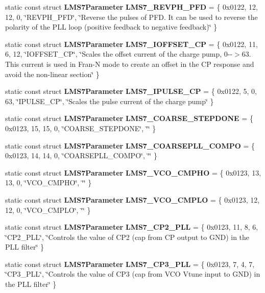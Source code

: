\begin{DoxyCompactItemize}
\item 
static const struct {\bf L\+M\+S7\+Parameter} {\bf L\+M\+S7\+\_\+\+R\+E\+V\+P\+H\+\_\+\+P\+FD} = \{ 0x0122, 12, 12, 0, \char`\"{}\+R\+E\+V\+P\+H\+\_\+\+P\+F\+D\char`\"{}, \char`\"{}\+Reverse the pulses of P\+F\+D. It can be used to reverse the polarity of the P\+L\+L loop (positive feedback to negative feedback)\char`\"{} \}
\item 
static const struct {\bf L\+M\+S7\+Parameter} {\bf L\+M\+S7\+\_\+\+I\+O\+F\+F\+S\+E\+T\+\_\+\+CP} = \{ 0x0122, 11, 6, 12, \char`\"{}\+I\+O\+F\+F\+S\+E\+T\+\_\+\+C\+P\char`\"{}, \char`\"{}\+Scales the offset current of the charge pump, 0-\/-\/$>$63. This current is used in Fran-\/\+N mode to create an offset in the C\+P response and avoid the non-\/linear section\char`\"{} \}
\item 
static const struct {\bf L\+M\+S7\+Parameter} {\bf L\+M\+S7\+\_\+\+I\+P\+U\+L\+S\+E\+\_\+\+CP} = \{ 0x0122, 5, 0, 63, \char`\"{}\+I\+P\+U\+L\+S\+E\+\_\+\+C\+P\char`\"{}, \char`\"{}\+Scales the pulse current of the charge pump\char`\"{} \}
\item 
static const struct {\bf L\+M\+S7\+Parameter} {\bf L\+M\+S7\+\_\+\+C\+O\+A\+R\+S\+E\+\_\+\+S\+T\+E\+P\+D\+O\+NE} = \{ 0x0123, 15, 15, 0, \char`\"{}\+C\+O\+A\+R\+S\+E\+\_\+\+S\+T\+E\+P\+D\+O\+N\+E\char`\"{}, \char`\"{}\char`\"{} \}
\item 
static const struct {\bf L\+M\+S7\+Parameter} {\bf L\+M\+S7\+\_\+\+C\+O\+A\+R\+S\+E\+P\+L\+L\+\_\+\+C\+O\+M\+PO} = \{ 0x0123, 14, 14, 0, \char`\"{}\+C\+O\+A\+R\+S\+E\+P\+L\+L\+\_\+\+C\+O\+M\+P\+O\char`\"{}, \char`\"{}\char`\"{} \}
\item 
static const struct {\bf L\+M\+S7\+Parameter} {\bf L\+M\+S7\+\_\+\+V\+C\+O\+\_\+\+C\+M\+P\+HO} = \{ 0x0123, 13, 13, 0, \char`\"{}\+V\+C\+O\+\_\+\+C\+M\+P\+H\+O\char`\"{}, \char`\"{}\char`\"{} \}
\item 
static const struct {\bf L\+M\+S7\+Parameter} {\bf L\+M\+S7\+\_\+\+V\+C\+O\+\_\+\+C\+M\+P\+LO} = \{ 0x0123, 12, 12, 0, \char`\"{}\+V\+C\+O\+\_\+\+C\+M\+P\+L\+O\char`\"{}, \char`\"{}\char`\"{} \}
\item 
static const struct {\bf L\+M\+S7\+Parameter} {\bf L\+M\+S7\+\_\+\+C\+P2\+\_\+\+P\+LL} = \{ 0x0123, 11, 8, 6, \char`\"{}\+C\+P2\+\_\+\+P\+L\+L\char`\"{}, \char`\"{}\+Controls the value of C\+P2 (cap from C\+P output to G\+N\+D) in the P\+L\+L filter\char`\"{} \}
\item 
static const struct {\bf L\+M\+S7\+Parameter} {\bf L\+M\+S7\+\_\+\+C\+P3\+\_\+\+P\+LL} = \{ 0x0123, 7, 4, 7, \char`\"{}\+C\+P3\+\_\+\+P\+L\+L\char`\"{}, \char`\"{}\+Controls the value of C\+P3 (cap from V\+C\+O Vtune input to G\+N\+D) in the P\+L\+L filter\char`\"{} \}

\end{DoxyCompactItemize}
